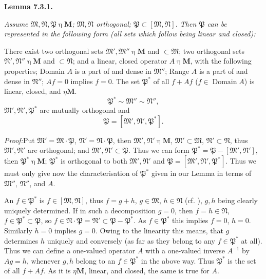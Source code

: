 \documentclass[12pt,b5paper,twoside]{article}
\newcommand{\M}{\mathbf M}
\newcommand{\Lemma}[1]{%
  \par\smallskip\noindent\phantomsection\label{lem:#1}\textbf{Lemma #1.}\enspace
}
\newcommand{\Proof}{\par\noindent\textit{Proof:}\enspace}
\begin{document}
\Lemma{7.3.1} {\itshape Assume
\(\mathfrak M,\mathfrak N,\mathfrak P\mathbin{\eta}\M\);
\(\mathfrak M,\mathfrak N\) orthogonal;
\(\mathfrak P\subset[\mathfrak M,\mathfrak N]\). Then
\(\mathfrak P\) can be represented in the following form (all sets which
follow being linear and closed):

There exist two orthogonal sets
\(\mathfrak M',\mathfrak M''\mathbin{\eta}\M\) and
\(\subset\mathfrak M\); two orthogonal sets
\(\mathfrak N',\mathfrak N''\mathbin{\eta}\M\) and
\(\subset\mathfrak N\); and a linear, closed operator
\(A\mathbin{\eta}\M\), with the following properties; Domain \(A\) is a
part of and dense in \(\mathfrak M''\); Range \(A\) is a part of and dense
in \(\mathfrak N''\); \(Af=0\) implies \(f=0\). The set
\(\mathfrak P^*\) of all \(f+Af\) (\(f\in\operatorname{Domain}A\)) is
linear, closed, and \(\mathbin{\eta}\M\).
\[
 \mathfrak P^*\sim\mathfrak M''\sim\mathfrak N'',
\]
\(\mathfrak M',\mathfrak N',\mathfrak P^*\) are mutually orthogonal and
\[
 \mathfrak P=[\mathfrak M',\mathfrak N',\mathfrak P^*].
\]}

\Proof Put \(\mathfrak M'=\mathfrak M\mathbin{\cdot}\mathfrak P\),
\(\mathfrak N'=\mathfrak N\mathbin{\cdot}\mathfrak P\), then
\(\mathfrak M',\mathfrak N'\mathbin{\eta}\M\),
\(\mathfrak M'\subset\mathfrak M\),
\(\mathfrak N'\subset\mathfrak N\), thus
\(\mathfrak M',\mathfrak N'\) are orthogonal; and
\(\mathfrak M',\mathfrak N'\subset\mathfrak P\). Thus we can form
\(\mathfrak P^*=\mathfrak P-[\mathfrak M',\mathfrak N']\), then
\(\mathfrak P^*\mathbin{\eta}\M\); \(\mathfrak P^*\) is orthogonal to
both \(\mathfrak M',\mathfrak N'\) and
\(\mathfrak P=[\mathfrak M',\mathfrak N',\mathfrak P^*]\). Thus we must
only give now the characterisation of \(\mathfrak P^*\) given in our Lemma
in terms of \(\mathfrak M''\), \(\mathfrak N''\), and \(A\).

An \(f\in\mathfrak P^*\) is
\(f\in[\mathfrak M,\mathfrak N]\), thus \(f=g+h\),
\(g\in\mathfrak M\), \(h\in\mathfrak N\) (cf. \cite[p.~76]{ref16}), \(g,h\)
being clearly uniquely determined. If in such a decomposition \(g=0\),
then \(f=h\in\mathfrak N\), \(f\in\mathfrak P^*\subset\mathfrak P\), so
\(f\in\mathfrak N\mathbin{\cdot}\mathfrak P
=\mathfrak N'\subset\mathfrak P-\mathfrak P^*\). As
\(f\in\mathfrak P^*\) this implies \(f=0\), \(h=0\). Similarly \(h=0\)
implies \(g=0\). Owing to the linearity this means, that \(g\) determines
\(h\) uniquely and conversely (as far as they belong to any
\(f\in\mathfrak P^*\) at all). Thus we can define a one-valued operator
\(A\) with a one-valued inverse \(A^{-1}\) by \(Ag=h\), whenever \(g,h\)
belong to an \(f\in\mathfrak P^*\) in the above way. Thus
\(\mathfrak P^*\) is the set of all \(f+Af\). As it is
\(\mathbin{\eta}\M\), linear, and closed, the same is true for \(A\).
\end{document}
